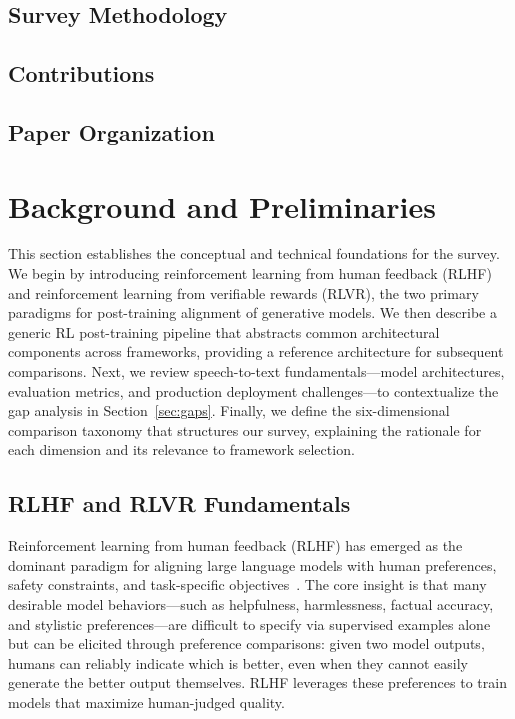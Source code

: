 \documentclass[conference]{IEEEtran}
\begin{document}
\subsection{Survey Methodology}

\subsection{Contributions}

\subsection{Paper Organization}

\section{Background and Preliminaries}
\label{sec:background}

This section establishes the conceptual and technical foundations for the survey. We begin by introducing reinforcement learning from human feedback (RLHF) and reinforcement learning from verifiable rewards (RLVR), the two primary paradigms for post-training alignment of generative models. We then describe a generic RL post-training pipeline that abstracts common architectural components across frameworks, providing a reference architecture for subsequent comparisons. Next, we review speech-to-text fundamentals—model architectures, evaluation metrics, and production deployment challenges—to contextualize the gap analysis in Section~\ref{sec:gaps}. Finally, we define the six-dimensional comparison taxonomy that structures our survey, explaining the rationale for each dimension and its relevance to framework selection.

\subsection{RLHF and RLVR Fundamentals}

Reinforcement learning from human feedback (RLHF) has emerged as the dominant paradigm for aligning large language models with human preferences, safety constraints, and task-specific objectives~\cite{instructgpt-paper, anthropic-hh-paper}. The core insight is that many desirable model behaviors—such as helpfulness, harmlessness, factual accuracy, and stylistic preferences—are difficult to specify via supervised examples alone but can be elicited through preference comparisons: given two model outputs, humans can reliably indicate which is better, even when they cannot easily generate the better output themselves. RLHF leverages these preferences to train models that maximize human-judged quality.
\end{document}
